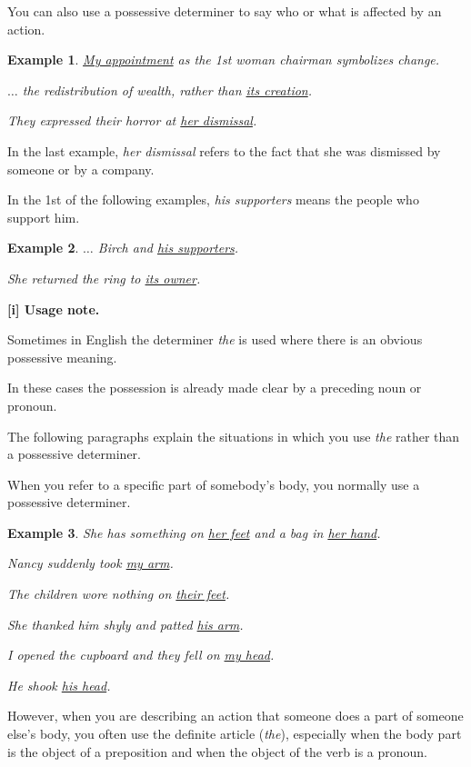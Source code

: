 \documentclass[oneside]{book}
\numberwithin{equation}{section}
\newtheorem{example}{Example}[section]
\begin{document}
%
\noindent{} You can also use a possessive determiner to say who or what is affected by an action.
\begin{example}
    \underline{My appointment} as the 1st woman chairman symbolizes change.
    
    $\ldots$ the redistribution of wealth, rather than \underline{its creation}.
    
    They expressed their horror at \underline{her dismissal}.
\end{example}
In the last example, \textit{her dismissal} refers to the fact that she was dismissed by someone or by a company.

%
In the 1st of the following examples, \textit{his supporters} means the people who support him.
\begin{example}
    $\ldots$ Birch and \underline{his supporters}.
    
    She returned the ring to \underline{its owner}.
\end{example}
%
\textbf{[i] Usage note.}

%
\noindent{} Sometimes in English the determiner \textit{the} is used where there is an obvious possessive meaning.

In these cases the possession is already made clear by a preceding noun or pronoun.

The following paragraphs explain the situations in which you use \textit{the} rather than a possessive determiner.

%
\noindent{} When you refer to a specific part of somebody's body, you normally use a possessive determiner.
\begin{example}
    She has something on \underline{her feet} and a bag in \underline{her hand}.
    
    Nancy suddenly took \underline{my arm}.
    
    The children wore nothing on \underline{their feet}.
    
    She thanked him shyly and patted \underline{his arm}.
    
    I opened the cupboard and they fell on \underline{my head}.
    
    He shook \underline{his head}.
\end{example}
However, when you are describing an action that someone does a part of someone else's body, you often use the definite article (\textit{the}), especially when the body part is the object of a preposition and when the object of the verb is a pronoun.
\end{document}
